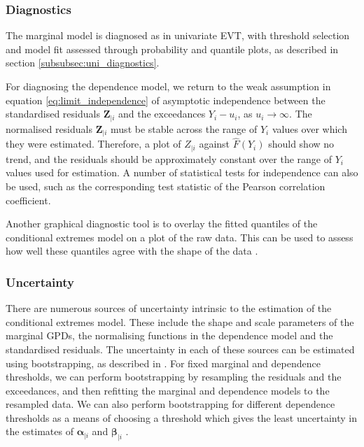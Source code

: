 \documentclass{article}
\numberwithin{equation}{section}
\begin{document}
\subsubsection{Diagnostics} \label{subsubsec:ce_diagnostics}

The marginal model is diagnosed as in univariate EVT, with threshold selection and model fit assessed through probability and quantile plots, as described in section \ref{subsubsec:uni_diagnostics}.

For diagnosing the dependence model, we return to the weak assumption in equation \ref{eq:limit_independence} of asymptotic independence between the standardised residuals $\bm{Z}_{\mid i}$ and the exceedances $Y_i - u_i$, as $u_i \to \infty$.
The normalised residuals $\bm{Z}_{\mid i}$ must be stable across the range of $Y_i$ values over which they were estimated. 
Therefore, a plot of $Z_{\mid i}$ against $\hat{F}(Y_i)$ should show no trend, and the residuals should be approximately constant over the range of $Y_i$ values used for estimation.
A number of statistical tests for independence can also be used, such as the corresponding test statistic of the Pearson correlation coefficient. 

Another graphical diagnostic tool is to overlay the fitted quantiles of the conditional extremes model on a plot of the raw data. 
This can be used to assess how well these quantiles agree with the shape of the data \citep{Southworth2024_vignette}.


\subsubsection{Uncertainty} \label{subsubsec:ce_uncertainty}


There are numerous sources of uncertainty intrinsic to the estimation of the conditional extremes model.
These include the shape and scale parameters of the marginal GPDs, the normalising functions in the dependence model and the standardised residuals. 
The uncertainty in each of these sources can be estimated using bootstrapping, as described in \citet{Heffernan2004}.
For fixed marginal and dependence thresholds, we can perform bootstrapping by resampling the residuals and the exceedances, and then refitting the marginal and dependence models to the resampled data.
We can also perform bootstrapping for different dependence thresholds as a means of choosing a threshold which gives the least uncertainty in the estimates of $\bm{\alpha}_{\mid i}$ and $\bm{\beta}_{\mid i}$ \citep{Southworth2024_vignette}.
\end{document}
